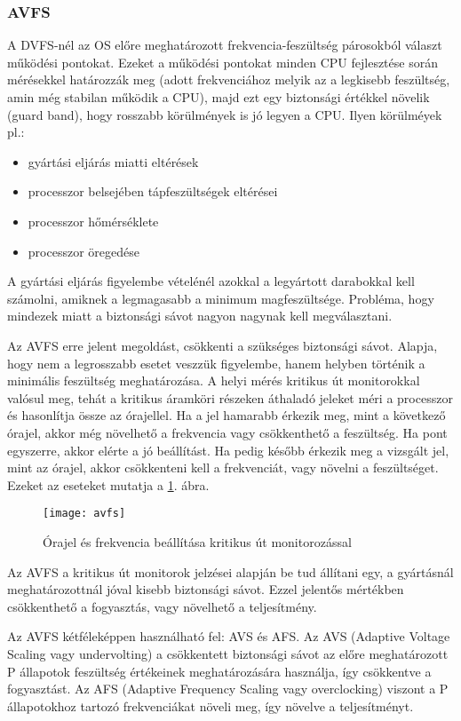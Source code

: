\subsubsection{AVFS}
A DVFS-nél az OS előre meghatározott frekvencia-feszültség párosokból választ működési pontokat.
Ezeket a működési pontokat minden CPU fejlesztése során mérésekkel határozzák meg (adott frekvenciához melyik az a legkisebb feszültség, amin még stabilan működik a CPU), majd ezt egy biztonsági értékkel növelik (guard band), hogy rosszabb körülmények is jó legyen a CPU.
Ilyen körülméyek pl.:
\begin{itemize}
    \item gyártási eljárás miatti eltérések
    \item processzor belsejében tápfeszültségek eltérései
    \item processzor hőmérséklete
    \item processzor öregedése
\end{itemize}
A gyártási eljárás figyelembe vételénél azokkal a legyártott darabokkal kell számolni, amiknek a legmagasabb a minimum magfeszültsége.
Probléma, hogy mindezek miatt a biztonsági sávot nagyon nagynak kell megválasztani.

Az AVFS erre jelent megoldást, csökkenti a szükséges biztonsági sávot.
Alapja, hogy nem a legrosszabb esetet veszzük figyelembe, hanem helyben történik a minimális feszültség meghatározása.
A helyi mérés kritikus út monitorokkal valósul meg, tehát a kritikus áramköri részeken áthaladó jeleket méri a processzor és hasonlítja össze az órajellel.
Ha a jel hamarabb érkezik meg, mint a következő órajel, akkor még növelhető a frekvencia vagy csökkenthető a feszültség.
Ha pont egyszerre, akkor elérte a jó beállítást.
Ha pedig később érkezik meg a vizsgált jel, mint az órajel, akkor csökkenteni kell a frekvenciát, vagy növelni a feszültséget.
Ezeket az eseteket mutatja a \ref{fig:avfs}. ábra.
\begin{figure}[H]
    \texttt{[image: avfs]}
    \centering
    \caption{Órajel és frekvencia beállítása kritikus út monitorozással}
    \label{fig:avfs}
\end{figure}
Az AVFS a kritikus út monitorok jelzései alapján be tud állítani egy, a gyártásnál meghatározottnál jóval kisebb biztonsági sávot.
Ezzel jelentős mértékben csökkenthető a fogyasztás, vagy növelhető a teljesítmény.

Az AVFS kétféleképpen használható fel: AVS és AFS.
Az AVS (Adaptive Voltage Scaling vagy undervolting) a csökkentett biztonsági sávot az előre meghatározott P állapotok feszültség értékeinek meghatározására használja, így csökkentve a fogyasztást.
Az AFS (Adaptive Frequency Scaling vagy overclocking) viszont a P állapotokhoz tartozó frekvenciákat növeli meg, így növelve a teljesítményt.

